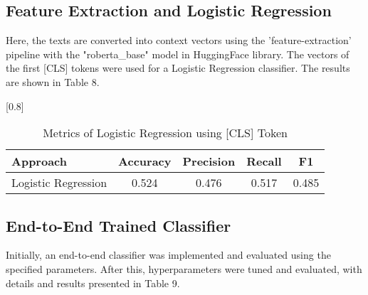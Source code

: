 \documentclass[a4paper,11pt]{article}
\begin{document}
\subsection{Feature Extraction and Logistic Regression}
Here, the texts are converted into context vectors using the 'feature-extraction' pipeline with the "roberta\_base" model in HuggingFace library.
The vectors of the first [CLS] tokens were used for a Logistic Regression classifier.
The results are shown in Table 8.

\begin{table}[htbp]
    \centering
    \caption{Metrics of Logistic Regression using [CLS] Token}
    \small
    \scalebox{0.8}[0.8]{
    \begin{tabular}{l|cccc}
         Approach & Accuracy & Precision & Recall & F1 \\ \hline 
         Logistic Regression & 0.524 & 0.476 & 0.517 & 0.485 \\ 

    \end{tabular}

    }
\end{table}
\subsection{End-to-End Trained Classifier}




Initially, an end-to-end classifier was implemented and evaluated using the specified parameters.
After this, hyperparameters were tuned and evaluated, with details and results presented in Table 9.
\end{document}
